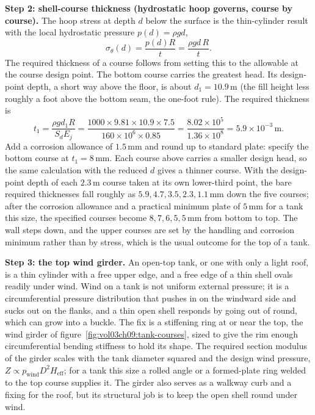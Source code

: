 \textbf{Step 2: shell-course thickness (hydrostatic hoop governs, course by
course).} The hoop stress at depth $d$ below the surface is the
thin-cylinder result with the local hydrostatic pressure $p(d) = \rho g d$,
\[
\sigma_\theta(d) = \frac{p(d) R}{t} = \frac{\rho g d\, R}{t}.
\]
The required thickness of a course follows from setting this to the
allowable at the course design point. The bottom course carries the
greatest head. Its design-point depth, a short way above the floor, is
about $d_1 = 10.9\,\si{\meter}$ (the fill height less roughly a foot above
the bottom seam, the one-foot rule). The required thickness is
\[
t_1 = \frac{\rho g d_1 R}{S_d E_j}
= \frac{1000\times 9.81\times 10.9\times 7.5}{160\times 10^6\times 0.85}
= \frac{8.02\times 10^5}{1.36\times 10^8}
= 5.9\times 10^{-3}\,\text{m}.
\]
Add a corrosion allowance of $1.5\,\si{\milli\meter}$ and round up to
standard plate: specify the bottom course at $t_1 = 8\,\si{\milli\meter}$.
Each course above carries a smaller design head, so the same calculation
with the reduced $d$ gives a thinner course. With the design-point depth of
each $2.3\,\si{\meter}$ course taken at its own lower-third point, the bare
required thicknesses fall roughly as $5.9, 4.7, 3.5, 2.3, 1.1\,\si{
\milli\meter}$ down the five courses; after the corrosion allowance and a
practical minimum plate of $5\,\si{\milli\meter}$ for a tank this size, the
specified courses become $8, 7, 6, 5, 5\,\si{\milli\meter}$ from bottom to
top. The wall steps down, and the upper courses are set by the handling and
corrosion minimum rather than by stress, which is the usual outcome for the
top of a tank.

\textbf{Step 3: the top wind girder.} An open-top tank, or one with only a
light roof, is a thin cylinder with a free upper edge, and a free edge of a
thin shell ovals readily under wind. Wind on a tank is not uniform external
pressure; it is a circumferential pressure distribution that pushes in on
the windward side and sucks out on the flanks, and a thin open shell
responds by going out of round, which can grow into a buckle. The fix is a
stiffening ring at or near the top, the wind girder of
figure~\ref{fig:vol03ch09:tank-courses}, sized to give the rim enough
circumferential bending stiffness to hold its shape. The required section
modulus of the girder scales with the tank diameter squared and the design
wind pressure, $Z \propto p_{\text{wind}} D^2 H_{\text{eff}}$; for a tank
this size a rolled angle or a formed-plate ring welded to the top course
supplies it. The girder also serves as a walkway curb and a fixing for the
roof, but its structural job is to keep the open shell round under wind.

